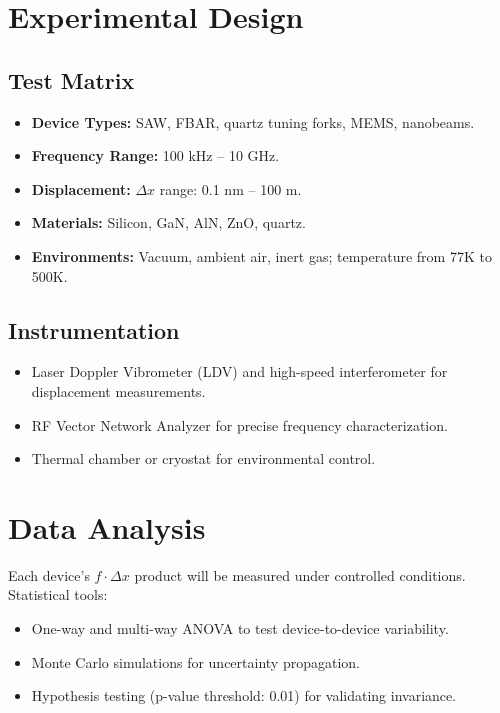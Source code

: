 \documentclass[preprint]{revtex4-2}
\begin{document}
        \section*{Experimental Design}

        \subsection*{Test Matrix}
        \begin{itemize}
            \item \textbf{Device Types:} SAW, FBAR, quartz tuning forks, MEMS, nanobeams.
            \item \textbf{Frequency Range:} 100 kHz -- 10 GHz.
            \item \textbf{Displacement:} \( \Delta x \) range: 0.1 nm -- 100 \textmu m.
            \item \textbf{Materials:} Silicon, GaN, AlN, ZnO, quartz.
            \item \textbf{Environments:} Vacuum, ambient air, inert gas; temperature from 77K to 500K.
        \end{itemize}

        \subsection*{Instrumentation}
        \begin{itemize}
            \item Laser Doppler Vibrometer (LDV) and high-speed interferometer for displacement measurements.
            \item RF Vector Network Analyzer for precise frequency characterization.
            \item Thermal chamber or cryostat for environmental control.
        \end{itemize}

        \section*{Data Analysis}
        Each device's \( f \cdot \Delta x \) product will be measured under controlled conditions. Statistical tools:
        \begin{itemize}
            \item One-way and multi-way ANOVA to test device-to-device variability.
            \item Monte Carlo simulations for uncertainty propagation.
            \item Hypothesis testing (p-value threshold: 0.01) for validating invariance.
        \end{itemize}
\end{document}
